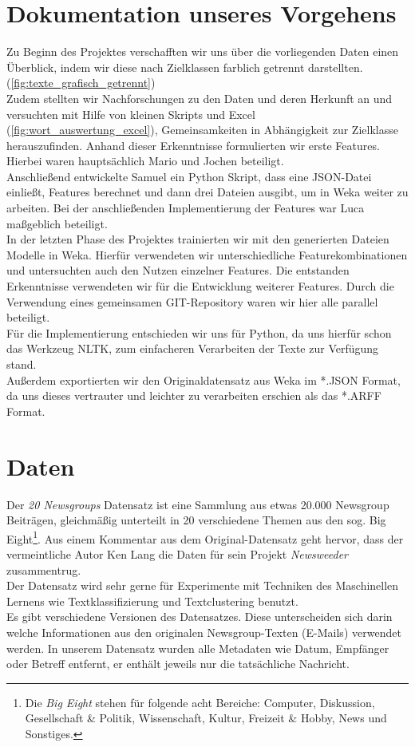 \documentclass[
	11pt,
	a4paper
]{scrartcl}
\begin{document}
\section{Dokumentation unseres Vorgehens}
Zu Beginn des Projektes verschafften wir uns über die vorliegenden Daten einen Überblick,
indem wir diese nach Zielklassen farblich getrennt darstellten. (\autoref{fig:texte_grafisch_getrennt})\\
Zudem stellten wir Nachforschungen zu den Daten und deren Herkunft an und versuchten mit Hilfe von kleinen
Skripts und Excel (\autoref{fig:wort_auswertung_excel}), Gemeinsamkeiten in Abhängigkeit zur Zielklasse
herauszufinden. Anhand dieser Erkenntnisse formulierten wir erste Features. Hierbei waren hauptsächlich Mario
und Jochen beteiligt.\\

Anschließend entwickelte Samuel ein Python Skript, dass eine JSON-Datei einließt, Features berechnet und
dann drei Dateien ausgibt, um in Weka weiter zu arbeiten. Bei der anschließenden Implementierung der Features war Luca
maßgeblich beteiligt.\\

In der letzten Phase des Projektes trainierten wir mit den generierten Dateien Modelle in Weka. Hierfür verwendeten wir
unterschiedliche Featurekombinationen und untersuchten auch den Nutzen einzelner Features. Die entstanden Erkenntnisse
verwendeten wir für die Entwicklung weiterer Features. Durch die Verwendung eines gemeinsamen GIT-Repository waren wir
hier alle parallel beteiligt.\\

Für die Implementierung entschieden wir uns für Python, da uns hierfür schon das Werkzeug NLTK, zum einfacheren Verarbeiten
der Texte zur Verfügung stand.\\
Außerdem exportierten wir den Originaldatensatz aus Weka im *.JSON Format, da uns dieses vertrauter und leichter zu verarbeiten
erschien als das *.ARFF Format.


\section{Daten}
Der \emph{20 Newsgroups} Datensatz ist eine Sammlung aus etwas 20.000 Newsgroup Beiträgen, gleichmäßig unterteilt in 20
verschiedene Themen aus den sog. Big Eight\footnote{Die \emph{Big Eight} stehen für folgende acht Bereiche: Computer,
Diskussion, Gesellschaft \& Politik, Wissenschaft, Kultur, Freizeit \& Hobby, News und Sonstiges.}. Aus einem Kommentar
aus dem Original-Datensatz geht hervor, dass der vermeintliche Autor Ken Lang die Daten für sein Projekt \emph{Newsweeder}
zusammentrug.\\
Der Datensatz wird sehr gerne für Experimente mit Techniken des Maschinellen Lernens wie Textklassifizierung und
Textclustering  benutzt.\\
Es gibt verschiedene Versionen des Datensatzes. Diese unterscheiden sich darin welche Informationen aus den originalen
Newsgroup-Texten (E-Mails) verwendet werden. In unserem Datensatz wurden alle Metadaten wie Datum, Empfänger oder Betreff
entfernt, er enthält jeweils nur die tatsächliche Nachricht.\\
\end{document}

